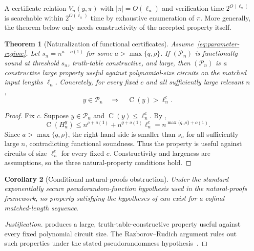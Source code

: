 \documentclass[11pt]{article}
\newtheorem{theorem}{Theorem}[section]
\newtheorem{corollary}[theorem]{Corollary}
\theoremstyle{definition}
\newcommand{\Ckt}{\operatorname{C}}
\begin{document}
A certificate relation $V_n(y,\pi)$ with $|\pi|=O(\ell_n)$ and verification time $2^{O(\ell_n)}$ is searchable within $2^{O(\ell_n)}$ time by exhaustive enumeration of $\pi$. More generally, the theorem below only needs constructivity of the accepted property itself.

\begin{theorem}[Naturalization of functional certificates]\label{thm:naturalization}
Assume~\eqref{eq:parameter-regime}. Let $s_n=n^{a-o(1)}$ for some $a>\max\{q,\rho\}$. If $(\mathcal{P}_n)$ is functionally sound at threshold $s_n$, truth-table constructive, and large, then $(\mathcal{P}_n)$ is a constructive large property useful against polynomial-size circuits on the matched input lengths $\ell_n$. Concretely, for every fixed $c$ and all sufficiently large relevant $n$,
\begin{equation}\label{eq:usefulness}
  y\in\mathcal{P}_n
  \quad\Longrightarrow\quad
  \Ckt(y)>\ell_n^c.
\end{equation}
\end{theorem}

\begin{proof}
Fix $c$. Suppose $y\in\mathcal{P}_n$ and $\Ckt(y)\le\ell_n^c$. By ,
\[
  \Ckt(H_n^y)
  \le n^{\rho+o(1)}+n^{q+o(1)}\ell_n^c
  =n^{\max\{q,\rho\}+o(1)}.
\]
Since $a>\max\{q,\rho\}$, the right-hand side is smaller than $s_n$ for all sufficiently large $n$, contradicting functional soundness. Thus the property is useful against circuits of size $\ell_n^c$ for every fixed $c$. Constructivity and largeness are assumptions, so the three natural-property conditions hold.
\end{proof}

\begin{corollary}[Conditional natural-proofs obstruction]\label{cor:natural-barrier}
Under the standard exponentially secure pseudorandom-function hypothesis used in the natural-proofs framework, no property satisfying the hypotheses of  can exist for a cofinal matched-length sequence.
\end{corollary}

\begin{proof}[Justification]
 produces a large, truth-table-constructive property useful against every fixed polynomial circuit size. The Razborov--Rudich argument rules out such properties under the stated pseudorandomness hypothesis~\cite{RR97,GGM86}.
\end{proof}
\end{document}
